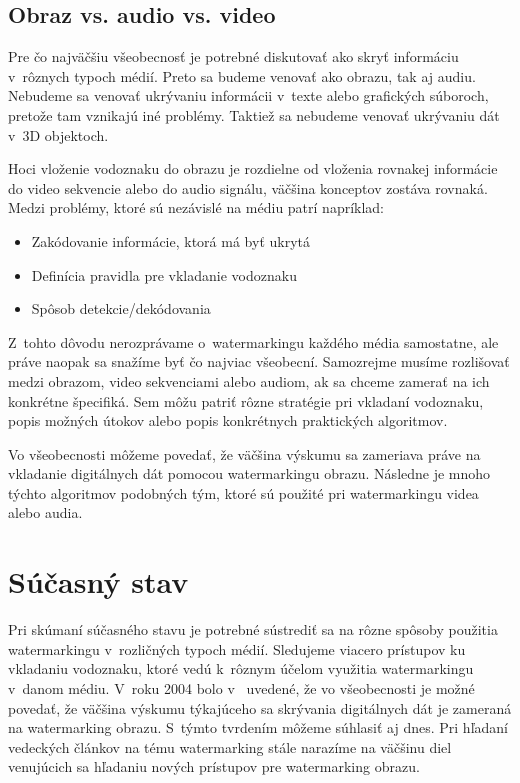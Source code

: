 \section{Obraz vs. audio vs. video}
Pre čo najväčšiu všeobecnosť je potrebné diskutovať ako skryť informáciu v~rôznych typoch médií. Preto sa budeme venovať ako obrazu, tak aj audiu. Nebudeme sa venovať ukrývaniu informácii v~texte alebo grafických súboroch, pretože tam vznikajú iné problémy. Taktiež sa nebudeme venovať ukrývaniu dát v~3D objektoch.

Hoci vloženie vodoznaku do obrazu je rozdielne od vloženia rovnakej informácie do video sekvencie alebo do audio signálu, väčšina konceptov zostáva rovnaká. Medzi problémy, ktoré sú nezávislé na médiu patrí napríklad:

\begin{itemize}
\item Zakódovanie informácie, ktorá má byť ukrytá
\item Definícia pravidla pre vkladanie vodoznaku
\item Spôsob detekcie/dekódovania
\end{itemize}

Z~tohto dôvodu nerozprávame o~watermarkingu každého média samostatne, ale práve naopak sa snažíme byť čo najviac všeobecní. Samozrejme musíme rozlišovať medzi obrazom, video sekvenciami alebo audiom, ak sa chceme zamerať na ich konkrétne špecifiká. Sem môžu patriť rôzne stratégie pri vkladaní vodoznaku, popis možných útokov alebo popis konkrétnych praktických algoritmov.

Vo všeobecnosti môžeme povedať, že väčšina výskumu sa zameriava práve na vkladanie digitálnych dát pomocou watermarkingu obrazu. Následne je mnoho týchto algoritmov podobných tým, ktoré sú použité pri watermarkingu videa alebo audia. \cite{Barni}


\chapter{Súčasný stav}
Pri skúmaní súčasného stavu je potrebné sústrediť sa na rôzne spôsoby použitia watermarkingu v~rozličných typoch médií. Sledujeme viacero prístupov ku vkladaniu vodoznaku, ktoré vedú k~rôznym účelom využitia watermarkingu v~danom médiu. V~roku 2004 bolo v~\cite{Barni} uvedené, že vo všeobecnosti je možné povedať, že väčšina výskumu týkajúceho sa skrývania digitálnych dát je zameraná na watermarking obrazu. S~týmto tvrdením môžeme súhlasiť aj dnes. Pri hľadaní vedeckých článkov na tému watermarking stále narazíme na väčšinu diel venujúcich sa hľadaniu nových prístupov pre watermarking obrazu.

